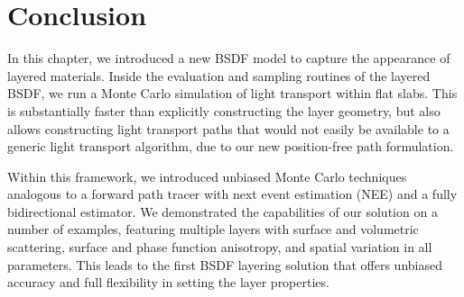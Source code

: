 \section{Conclusion}
\label{sec:layeredbsdf:conclusion}

In this chapter, we introduced a new BSDF model to capture the appearance of layered materials. Inside the evaluation and sampling routines of the layered BSDF, we run a Monte Carlo simulation of light transport within flat slabs. This is substantially faster than explicitly constructing the layer geometry, but also allows constructing light transport paths that would not easily be available to a generic light transport algorithm, due to our new position-free path formulation.

Within this framework, we introduced unbiased Monte Carlo techniques analogous to a forward path tracer with next event estimation (NEE) and a fully bidirectional estimator. We demonstrated the capabilities of our solution on a number of examples, featuring multiple layers with surface and volumetric scattering, surface and phase function anisotropy, and spatial variation in all parameters. This leads to the first BSDF layering solution that offers unbiased accuracy and full flexibility in setting the layer properties.
